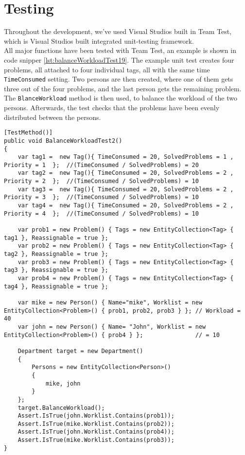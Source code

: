 \chapter{Testing}
\label{chap:testing}

Throughout the development, we've used Visual Studios built in Team Test, which is Visual Studios built integrated unit-testing framework. \cite{teamtest} \\

All major functions have been tested with Team Test, an example is shown in code snipper \ref{lst:balanceWorkloadTest19}. The example unit test creates four problems, all attached to four individual tags, all with the same time \verb+TimeConsumed+ setting. Two persons are then created, where one of them gets three out of the four problems, and the last person gets the remaining problem. The \verb+BlanceWorkload+ method is then used, to balance the workload of the two persons. Afterwards, the test checks that the problems have been evenly distributed between the persons.


\begin{lstlisting}[style=sourceCode, caption=\myCaption{An example unit test which tests a specific instance of the balanceWorkload method.}, label=lst:balanceWorkloadTest19]
[TestMethod()]
public void BalanceWorkloadTest2()
{
    var tag1 =  new Tag(){ TimeConsumed = 20, SolvedProblems = 1 , Priority = 1  };  //(TimeConsumed / SolvedProblems) = 20
    var tag2 =  new Tag(){ TimeConsumed = 20, SolvedProblems = 2 , Priority = 2  };  //(TimeConsumed / SolvedProblems) = 10
    var tag3 =  new Tag(){ TimeConsumed = 20, SolvedProblems = 2 , Priority = 3  };  //(TimeConsumed / SolvedProblems) = 10
    var tag4 =  new Tag(){ TimeConsumed = 20, SolvedProblems = 2 , Priority = 4  };  //(TimeConsumed / SolvedProblems) = 10

    var prob1 = new Problem() { Tags = new EntityCollection<Tag> { tag1 }, Reassignable = true };
    var prob2 = new Problem() { Tags = new EntityCollection<Tag> { tag2 }, Reassignable = true };
    var prob3 = new Problem() { Tags = new EntityCollection<Tag> { tag3 }, Reassignable = true };
    var prob4 = new Problem() { Tags = new EntityCollection<Tag> { tag4 }, Reassignable = true };
   
    var mike = new Person() { Name="mike", Worklist = new EntityCollection<Problem>() { prob1, prob2, prob3 } }; // Workload = 40
    var john = new Person() { Name= "John", Worklist = new EntityCollection<Problem>() { prob4 } };               // = 10

    Department target = new Department()
    {
        Persons = new EntityCollection<Person>()
        {
            mike, john
        }
    };
    target.BalanceWorkload();
    Assert.IsTrue(john.Worklist.Contains(prob1));
    Assert.IsTrue(mike.Worklist.Contains(prob2));
    Assert.IsTrue(john.Worklist.Contains(prob4));
    Assert.IsTrue(mike.Worklist.Contains(prob3));
}
\end{lstlisting}

